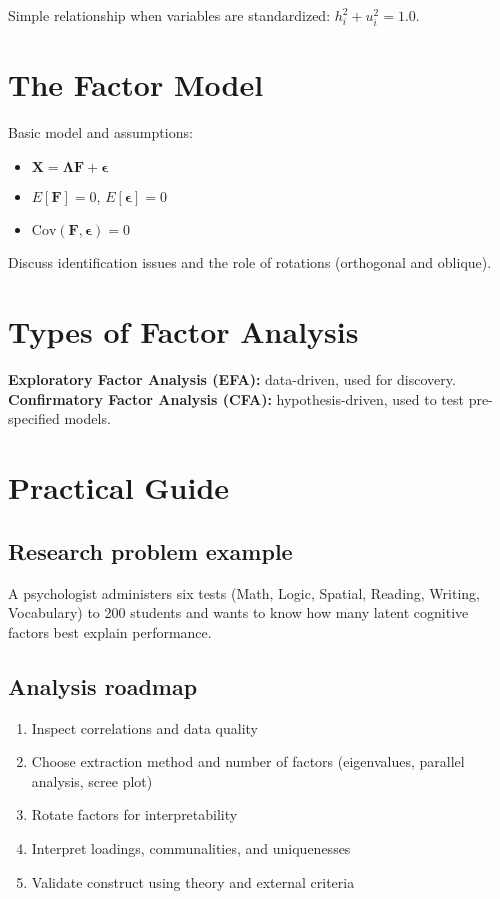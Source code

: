 \documentclass[a4paper]{tufte-book}
\begin{document}
Simple relationship when variables are standardized: $h_i^2 + u_i^2 = 1.0$.

\section{The Factor Model}
Basic model and assumptions:
\begin{itemize}
  \item $\mathbf{X} = \mathbf{\Lambda F} + \mathbf{\epsilon}$
  \item $E[\mathbf{F}] = 0$, $E[\mathbf{\epsilon}] = 0$
  \item $\mathrm{Cov}(\mathbf{F},\mathbf{\epsilon}) = 0$
\end{itemize}

Discuss identification issues and the role of rotations (orthogonal and oblique).

\section{Types of Factor Analysis}
\textbf{Exploratory Factor Analysis (EFA):} data-driven, used for discovery.
\newline
\textbf{Confirmatory Factor Analysis (CFA):} hypothesis-driven, used to test pre-specified models.

\section{Practical Guide}

\subsection{Research problem example}
A psychologist administers six tests (Math, Logic, Spatial, Reading, Writing, Vocabulary) to 200 students and wants to know how many latent cognitive factors best explain performance.

\subsection{Analysis roadmap}
\begin{enumerate}
  \item Inspect correlations and data quality
  \item Choose extraction method and number of factors (eigenvalues, parallel analysis, scree plot)
  \item Rotate factors for interpretability
  \item Interpret loadings, communalities, and uniquenesses
  \item Validate construct using theory and external criteria
\end{enumerate}
\end{document}
